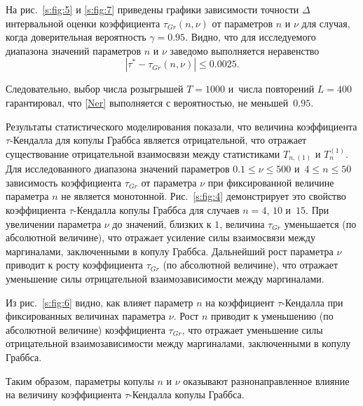  На рис.~\ref{s:fig:5} и \ref{s:fig:7} приведены графики зависимости  точности $\Delta$ интервальной оценки коэффициента $\tau_{Gr}(n,\nu)$ от параметров $n$  и $\nu$  для случая, когда доверительная вероятность $\gamma=0.95$. 
 Видно, что для исследуемого диапазона значений параметров $n$  и $\nu$ заведомо выполняется неравенство
\begin{equation}\label{Ner}
|\tau^*-\tau_{Gr}(n, \nu)|\le 0.0025.
\end{equation}


Следовательно, выбор числа  розыгрышей $T=1000$  и~числа повторений $L=400$ гарантировал, что \eqref{Ner} выполняется с вероятностью, не меньшей~$0.95$.

Результаты статистического моделирования показали, что величина коэффициента $\tau$-Кендалла для копулы Граббса является отрицательной,
что отражает  существование отрицательной взаимосвязи между статистиками  $T_{n,(1)}$ и $T_n^{(1)}$.
Для исследованного диапазона значений параметров $0.1 \le \nu \le 500$ и~$4\le n \le 50$ зависимость коэффициента $\tau_{Gr}$ от параметра $\nu$ при фиксированной величине параметра $n$ не является монотонной.
Рис.~\ref{s:fig:4} демонстрирует это свойство коэффициента $\tau$-Кендалла копулы Граббса  для случаев $n=4$, $10$ и~$15$.
При увеличении параметра $\nu$ до значений, близких к $1$, величина   $\tau_{Gr}$ уменьшается (по абсолютной величине), что отражает
усиление силы взаимосвязи между маргиналами, заключенными в копулу Граббса.
Дальнейший рост  параметра $\nu$ приводит к росту коэффициента   $\tau_{Gr}$ (по абсолютной величине), что отражает
уменьшение силы отрицательной взаимозависимости между маргиналами.

Из рис.~\ref{s:fig:6} видно, как влияет параметр $n$  на коэффициент  $\tau$-Кендалла при фиксированных величинах параметра $\nu$.
Рост $n$ приводит к  уменьшению    (по абсолютной величине) коэффициента $\tau_{Gr}$,  что отражает
уменьшение силы отрицательной взаимозависимости между маргиналами, заключенными в копулу Граббса.

Таким образом, параметры копулы  $n$  и $\nu$ оказывают разнонаправленное влияние на величину  коэффициента  $\tau$-Кендалла копулы Граббса.





